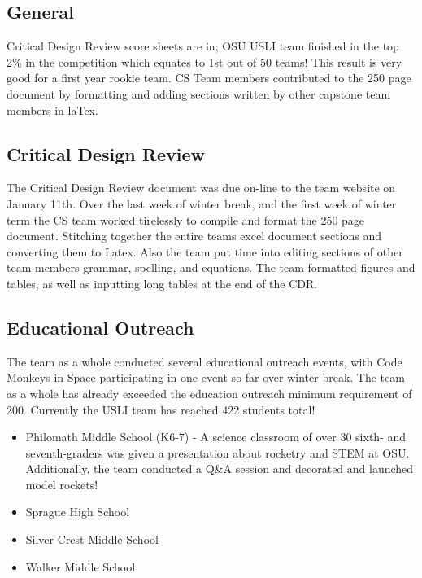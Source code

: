 \documentclass[onecolumn, draftclsnofoot,10pt, compsoc]{IEEEtran}
\begin{document}
\subsection{General}
Critical Design Review score sheets are in; OSU USLI team finished in the top 2\% in the competition which equates to 1st out of 50 teams! This result is very good for a first year rookie team. CS Team members contributed to the 250 page document by formatting and adding sections written by other capstone team members in laTex.

\subsection{Critical Design Review}
The Critical Design Review document was due on-line to the team website on January 11th. Over the last week of winter break, and the first week of winter term the CS team worked tirelessly to compile and format the 250 page document. Stitching together the entire teams excel document sections and converting them to Latex. Also the team put time into editing sections of other team members grammar, spelling, and equations. The team formatted figures and tables, as well as inputting long tables at the end of the CDR.

\subsection{Educational Outreach}
The team as a whole conducted several educational outreach events, with Code Monkeys in Space participating in one event so far over winter break. The team as a whole has already exceeded the education outreach minimum requirement of 200. Currently the USLI team has reached 422 students total!
\begin{itemize}
\item Philomath Middle School (K6-7) - A science classroom of over 30 sixth- and seventh-graders was given a presentation about rocketry and STEM at OSU. Additionally, the team conducted a Q\&A session and decorated and launched model rockets!
\item Sprague High School
\item Silver Crest Middle School
\item Walker Middle School
\end{itemize}
\end{document}
